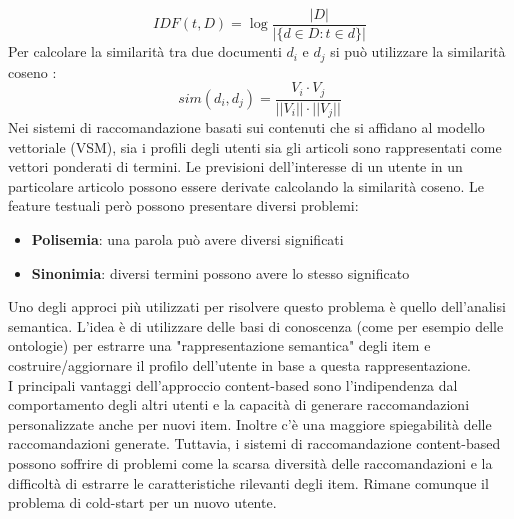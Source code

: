 \begin{equation}
    IDF(t,D) = \log \frac{|D|}{|\{d \in D : t \in d\}|}
\end{equation}
Per calcolare la similarità tra due documenti $d_i$ e $d_j$ si può utilizzare la similarità coseno \cite{CosineSim}:
\begin{equation}
    sim(d_i,d_j) = \frac{V_i \cdot V_j}{||V_i|| \cdot ||V_j||}
\end{equation}
Nei sistemi di raccomandazione basati sui contenuti che si affidano al modello vettoriale (VSM), sia i profili degli utenti sia gli articoli sono rappresentati come vettori ponderati di termini. Le previsioni dell'interesse di un utente in un particolare articolo possono essere derivate calcolando la similarità coseno.
Le feature testuali però possono presentare diversi problemi:
\begin{itemize}
    \item \textbf{Polisemia}: una parola può avere diversi significati
    \item \textbf{Sinonimia}: diversi termini possono avere lo stesso significato
\end{itemize}
Uno degli approci più utilizzati per risolvere questo problema è quello dell'analisi semantica. L'idea è di utilizzare delle basi di conoscenza (come per esempio delle ontologie) per estrarre una "rappresentazione semantica" degli item e costruire/aggiornare il profilo dell'utente in base a questa rappresentazione\cite{Lops2011}.\\

\noindent I principali vantaggi dell'approccio content-based sono l'indipendenza dal comportamento degli altri utenti e la capacità di generare raccomandazioni personalizzate anche per nuovi item. Inoltre c'è una maggiore spiegabilità delle raccomandazioni generate. Tuttavia, i sistemi di raccomandazione content-based possono soffrire di problemi come la scarsa diversità delle raccomandazioni e la difficoltà di estrarre le caratteristiche rilevanti degli item. Rimane comunque il problema di cold-start per un nuovo utente\cite{Lops2011}.


